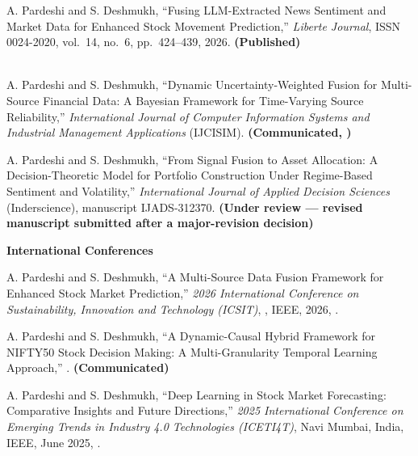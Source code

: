\begin{enumerate}[label={[P\arabic*]},leftmargin=2.6em,start=3]
\item A. Pardeshi and S. Deshmukh, ``Fusing LLM-Extracted News Sentiment and Market Data for
Enhanced Stock Movement Prediction,'' \emph{Liberte Journal}, ISSN 0024-2020, vol.~14, no.~6,
pp.~424--439, 2026. \textbf{(Published)}\\
\indexing{\LiberteIndexing} \\ \link{\LiberteURL}

\item A. Pardeshi and S. Deshmukh, ``Dynamic Uncertainty-Weighted Fusion for Multi-Source
Financial Data: A Bayesian Framework for Time-Varying Source Reliability,''
\emph{International Journal of Computer Information Systems and Industrial Management
Applications} (IJCISIM). \textbf{(Communicated, \IJCISIMDate)}\\
\link{\IJCISIMURL}

\item A. Pardeshi and S. Deshmukh, ``From Signal Fusion to Asset Allocation: A
Decision-Theoretic Model for Portfolio Construction Under Regime-Based Sentiment and
Volatility,'' \emph{International Journal of Applied Decision Sciences} (Inderscience),
manuscript IJADS-312370. \textbf{(Under review --- revised manuscript submitted after a
major-revision decision)}\\
\link{\IJADSURL}
\end{enumerate}

\textbf{International Conferences}

\begin{enumerate}[label={[P\arabic*]},leftmargin=2.6em]
\item A. Pardeshi and S. Deshmukh, ``A Multi-Source Data Fusion Framework for Enhanced Stock
Market Prediction,'' \emph{2026 International Conference on Sustainability, Innovation and
Technology (ICSIT)}, \ICSITVenue, IEEE, 2026, \ICSITPages.\\
\link{\ICSITURL}

\item A. Pardeshi and S. Deshmukh, ``A Dynamic-Causal Hybrid Framework for NIFTY50 Stock
Decision Making: A Multi-Granularity Temporal Learning Approach,'' \DCHFVenue.
\textbf{(Communicated)}\\
\link{\DCHFURL}
\setcounter{enumi}{5}
\item A. Pardeshi and S. Deshmukh, ``Deep Learning in Stock Market Forecasting: Comparative
Insights and Future Directions,'' \emph{2025 International Conference on Emerging Trends in
Industry 4.0 Technologies (ICETI4T)}, Navi Mumbai, India, IEEE, June 2025, \ICETIPages.\\
\link{\ICETIURL}
\end{enumerate}

